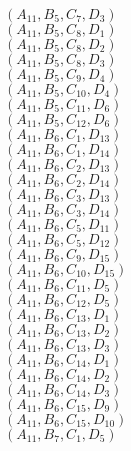 \documentclass[14pt]{article}
\begin{document}
    $({A}_{11}, {B}_{5}, {C}_{7}, {D}_{3}) $ \\ 
    $({A}_{11}, {B}_{5}, {C}_{8}, {D}_{1}) $ \\ 
    $({A}_{11}, {B}_{5}, {C}_{8}, {D}_{2}) $ \\ 
    $({A}_{11}, {B}_{5}, {C}_{8}, {D}_{3}) $ \\ 
    $({A}_{11}, {B}_{5}, {C}_{9}, {D}_{4}) $ \\ 
    $({A}_{11}, {B}_{5}, {C}_{10}, {D}_{4}) $ \\ 
    $({A}_{11}, {B}_{5}, {C}_{11}, {D}_{6}) $ \\ 
    $({A}_{11}, {B}_{5}, {C}_{12}, {D}_{6}) $ \\ 
    $({A}_{11}, {B}_{6}, {C}_{1}, {D}_{13}) $ \\ 
    $({A}_{11}, {B}_{6}, {C}_{1}, {D}_{14}) $ \\ 
    $({A}_{11}, {B}_{6}, {C}_{2}, {D}_{13}) $ \\ 
    $({A}_{11}, {B}_{6}, {C}_{2}, {D}_{14}) $ \\ 
    $({A}_{11}, {B}_{6}, {C}_{3}, {D}_{13}) $ \\ 
    $({A}_{11}, {B}_{6}, {C}_{3}, {D}_{14}) $ \\ 
    $({A}_{11}, {B}_{6}, {C}_{5}, {D}_{11}) $ \\ 
    $({A}_{11}, {B}_{6}, {C}_{5}, {D}_{12}) $ \\ 
    $({A}_{11}, {B}_{6}, {C}_{9}, {D}_{15}) $ \\ 
    $({A}_{11}, {B}_{6}, {C}_{10}, {D}_{15}) $ \\ 
    $({A}_{11}, {B}_{6}, {C}_{11}, {D}_{5}) $ \\ 
    $({A}_{11}, {B}_{6}, {C}_{12}, {D}_{5}) $ \\ 
    $({A}_{11}, {B}_{6}, {C}_{13}, {D}_{1}) $ \\ 
    $({A}_{11}, {B}_{6}, {C}_{13}, {D}_{2}) $ \\ 
    $({A}_{11}, {B}_{6}, {C}_{13}, {D}_{3}) $ \\ 
    $({A}_{11}, {B}_{6}, {C}_{14}, {D}_{1}) $ \\ 
    $({A}_{11}, {B}_{6}, {C}_{14}, {D}_{2}) $ \\ 
    $({A}_{11}, {B}_{6}, {C}_{14}, {D}_{3}) $ \\ 
    $({A}_{11}, {B}_{6}, {C}_{15}, {D}_{9}) $ \\ 
    $({A}_{11}, {B}_{6}, {C}_{15}, {D}_{10}) $ \\ 
    $({A}_{11}, {B}_{7}, {C}_{1}, {D}_{5}) $ \\ 
\end{document}
